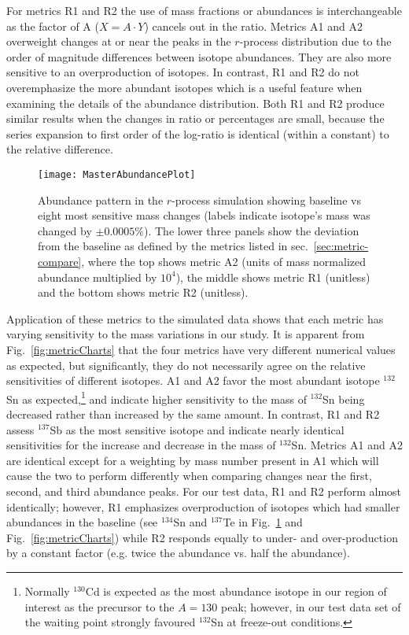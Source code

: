 \documentclass[aps,prc,reprint,showpacs,floatfix,nofootinbib]{revtex4-1}
\begin{document}
For metrics R1 and R2 the use of mass fractions or abundances is interchangeable as the factor of A ($X = A \cdot Y$) cancels out in 
the ratio. Metrics A1 and A2 overweight changes at or near the peaks in the $r$-process distribution due to the order of magnitude differences between isotope abundances. 
They are also more sensitive to an overproduction of isotopes. In contrast, R1 and R2 do not overemphasize the more abundant isotopes which is a useful feature when examining the details of the abundance distribution. Both R1 and R2 produce similar results when the changes in ratio or percentages are small, because the series expansion to first order of the log-ratio is identical (within a constant) to the relative difference. 

\begin{figure}
\texttt{[image: MasterAbundancePlot]}
\caption{Abundance pattern in the $r$-process simulation showing baseline vs eight most sensitive mass 
changes (labels indicate isotope's mass was changed by
$\pm0.0005\%$). The lower three panels show the deviation from the baseline as defined by the 
metrics listed in sec.~\ref{sec:metric-compare}, where the top shows metric A2 (units of mass normalized 
abundance multiplied by $10^4$), the middle shows metric R1 (unitless) and the bottom shows metric R2 (unitless). \label{fig:simulationAbundances}}
\end{figure}

Application of these metrics to the simulated data shows that each metric has varying sensitivity to the mass variations in our study. It is apparent from Fig.~\ref{fig:metricCharts}
that the four metrics have very different numerical values as expected, but significantly, they do not necessarily agree on the relative sensitivities of different isotopes. 
A1 and A2 favor the most abundant isotope $^{132}$Sn as 
expected,\footnote{Normally $^{130}$Cd is expected as the most abundance isotope in our region of interest as the precursor to the $A=130$ peak; however, in our test data set of 
the waiting point strongly favoured $^{132}$Sn at freeze-out conditions.} 
and indicate higher sensitivity to the mass of $^{132}$Sn being decreased rather than increased by the same amount.
In contrast, R1 and R2 assess $^{137}$Sb as the 
most sensitive isotope and indicate nearly identical sensitivities for the increase and decrease in 
the mass of $^{132}$Sn. Metrics A1 and A2 are identical except for a weighting by mass number present in A1 which 
will cause the two to perform differently when comparing changes near the first, second, and third abundance peaks. 
For our test data, R1 and R2 perform almost 
identically; however, R1 emphasizes overproduction of isotopes which had smaller abundances in the baseline (see $^{134}$Sn and $^{137}$Te in 
Fig.~\ref{fig:simulationAbundances} and Fig.~\ref{fig:metricCharts}) while R2 responds equally to under- and over-production by a constant factor (e.g. twice the abundance vs. half the abundance). 
\end{document}

